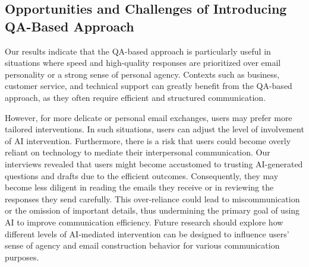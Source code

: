 \subsection{Opportunities and Challenges of Introducing QA-Based Approach}
Our results indicate that the QA-based approach 
is particularly useful in situations where speed and high-quality responses are prioritized over email personality or a strong sense of personal agency. 
Contexts such as business, customer service, and technical support can greatly benefit from the QA-based approach, as they often require efficient and structured communication.

However, for more delicate or personal email exchanges, users may prefer more tailored interventions. 
In such situations, users can adjust the level of involvement of AI intervention.
Furthermore, there is a risk that users could become overly reliant on technology to mediate their interpersonal communication. 
Our interviews revealed that users might become accustomed to trusting AI-generated questions and drafts due to the efficient outcomes. 
Consequently, they may become less diligent in reading the emails they receive or in reviewing the responses they send carefully.
This over-reliance could lead to miscommunication or the omission of important details, thus undermining the primary goal of using AI to improve communication efficiency.
Future research should explore how different levels of AI-mediated intervention can be designed to influence users’ sense of agency and email construction behavior for various communication purposes.


